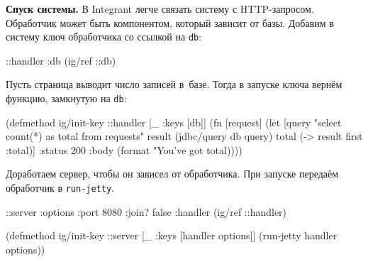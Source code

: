
\textbf{Спуск системы.} В Integrant легче связать систему с
HTTP-запросом. Обработчик может быть компонентом, который зависит от
базы. Добавим в систему ключ обработчика со ссылкой на \verb|db|:

\begin{english}
  \begin{clojure}
{::handler {:db (ig/ref ::db)}}
  \end{clojure}
\end{english}

\noindent

Пусть страница выводит число записей в~базе. Тогда в запуске ключа вернём
функцию, замкнутую на \verb|db|:

\ifnarrow

\begin{english}
  \begin{clojure}
(defmethod ig/init-key ::handler
  [_ {:keys [db]}]
  (fn [request]
    (let [query "select count(*) as total
                 from requests"
          result (jdbc/query db query)
          total (-> result first :total)]
      {:status 200
       :body (format
               "You've got %
               total)})))
  \end{clojure}
\end{english}

\else

\begin{english}
\end{english}

\fi

Доработаем сервер, чтобы он зависел от обработчика. При запуске передаём
обработчик в \verb|run-jetty|.

\ifnarrow

\begin{english}
  \begin{clojure}
{::server {:options {:port 8080
                     :join? false}
           :handler (ig/ref ::handler)}}

(defmethod ig/init-key ::server
  [_ {:keys [handler options]}]
  (run-jetty handler options))
  \end{clojure}
\end{english}

